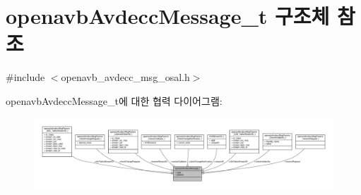 \hypertarget{structopenavb_avdecc_message__t}{}\section{openavb\+Avdecc\+Message\+\_\+t 구조체 참조}
\label{structopenavb_avdecc_message__t}


{\ttfamily \#include $<$openavb\+\_\+avdecc\+\_\+msg\+\_\+osal.\+h$>$}



openavb\+Avdecc\+Message\+\_\+t에 대한 협력 다이어그램\+:
\nopagebreak
\begin{figure}[H]
\begin{center}
\leavevmode
\includegraphics[width=350pt]{structopenavb_avdecc_message__t__coll__graph}
\end{center}
\end{figure}
